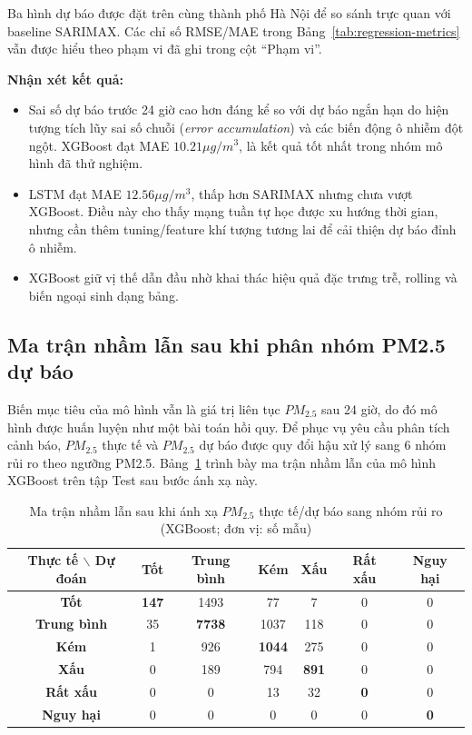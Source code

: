 \documentclass[12pt,a4paper]{article}
\begin{document}
Ba hình dự báo được đặt trên cùng thành phố Hà Nội để so sánh trực quan với baseline SARIMAX. Các chỉ số RMSE/MAE trong Bảng~\ref{tab:regression-metrics} vẫn được hiểu theo phạm vi đã ghi trong cột ``Phạm vi''.

\textbf{Nhận xét kết quả:}
\begin{itemize}
    \item Sai số dự báo trước 24 giờ cao hơn đáng kể so với dự báo ngắn hạn do hiện tượng tích lũy sai số chuỗi (\textit{error accumulation}) và các biến động ô nhiễm đột ngột. XGBoost đạt MAE $10.21 \mu g/m^3$, là kết quả tốt nhất trong nhóm mô hình đã thử nghiệm.
    \item LSTM đạt MAE $12.56 \mu g/m^3$, thấp hơn SARIMAX nhưng chưa vượt XGBoost. Điều này cho thấy mạng tuần tự học được xu hướng thời gian, nhưng cần thêm tuning/feature khí tượng tương lai để cải thiện dự báo đỉnh ô nhiễm.
    \item XGBoost giữ vị thế dẫn đầu nhờ khai thác hiệu quả đặc trưng trễ, rolling và biến ngoại sinh dạng bảng.
\end{itemize}

\subsection{Ma trận nhầm lẫn sau khi phân nhóm PM2.5 dự báo}

Biến mục tiêu của mô hình vẫn là giá trị liên tục $PM_{2.5}$ sau 24 giờ, do đó mô hình được huấn luyện như một bài toán hồi quy. Để phục vụ yêu cầu phân tích cảnh báo, $PM_{2.5}$ thực tế và $PM_{2.5}$ dự báo được quy đổi hậu xử lý sang 6 nhóm rủi ro theo ngưỡng PM2.5. Bảng~\ref{tab:confusion-matrix} trình bày ma trận nhầm lẫn của mô hình XGBoost trên tập Test sau bước ánh xạ này.

\begin{table}[H]
    \centering
    \caption{Ma trận nhầm lẫn sau khi ánh xạ $PM_{2.5}$ thực tế/dự báo sang nhóm rủi ro (XGBoost; đơn vị: số mẫu)}
    \label{tab:confusion-matrix}
    \begin{tabular}{c|cccccc}
        \toprule
        \textbf{Thực tế $\backslash$ Dự đoán} & \textbf{Tốt} & \textbf{Trung bình} & \textbf{Kém} & \textbf{Xấu} & \textbf{Rất xấu} & \textbf{Nguy hại} \\
        \midrule
        \textbf{Tốt} & \textbf{147} & 1493 & 77 & 7 & 0 & 0 \\
        \textbf{Trung bình} & 35 & \textbf{7738} & 1037 & 118 & 0 & 0 \\
        \textbf{Kém} & 1 & 926 & \textbf{1044} & 275 & 0 & 0 \\
        \textbf{Xấu} & 0 & 189 & 794 & \textbf{891} & 0 & 0 \\
        \textbf{Rất xấu} & 0 & 0 & 13 & 32 & \textbf{0} & 0 \\
        \textbf{Nguy hại} & 0 & 0 & 0 & 0 & 0 & \textbf{0} \\
        \bottomrule
    \end{tabular}
\end{table}
\end{document}
